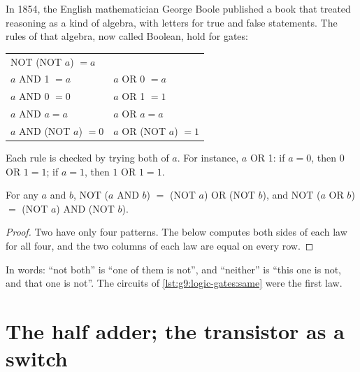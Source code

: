 In 1854, the English mathematician George Boole published a book that treated
reasoning as a kind of algebra, with letters for true and false statements.
The rules of that algebra, now called Boolean, hold for gates:

\begin{center}\small
\begin{tabular}{@{}ll@{}}
NOT (NOT $a$) $= a$ & \\
$a$ AND 1 $= a$ & $a$ OR 0 $= a$ \\
$a$ AND 0 $= 0$ & $a$ OR 1 $= 1$ \\
$a$ AND $a = a$ & $a$ OR $a = a$ \\
$a$ AND (NOT $a$) $= 0$ & $a$ OR (NOT $a$) $= 1$ \\
\end{tabular}
\end{center}

Each rule is checked by trying both  of $a$. For instance,
$a$ OR 1: if $a = 0$, then $0$ OR $1 = 1$; if $a = 1$, then $1$ OR $1 = 1$.

\begin{proposition}\label{prop:g9:logic-gates:de-morgan}
For any  $a$ and $b$,
NOT ($a$ AND $b$) $=$ (NOT $a$) OR (NOT $b$), and
NOT ($a$ OR $b$) $=$ (NOT $a$) AND (NOT $b$).
\end{proposition}

\begin{proof}
Two  have only four patterns. The  below computes both sides of
each law for all four, and the two columns of each law are equal on every row.
\end{proof}

\label{lst:g9:logic-gates:de-morgan}

\label{out:g9:logic-gates:de-morgan}

In words: ``not both'' is ``one of them is not'', and ``neither'' is ``this
one is not, and that one is not''. The circuits of
\cref{lst:g9:logic-gates:same} were the first law.

\section{The half adder; the transistor as a switch}


